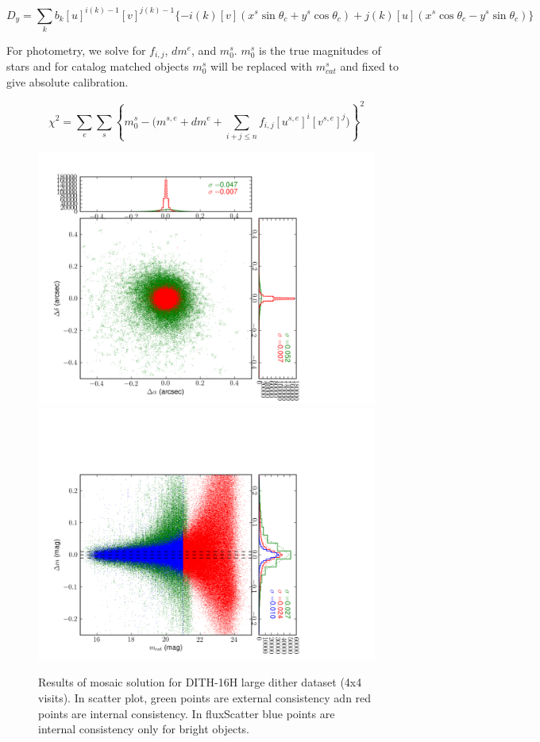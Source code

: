 \documentclass[12pt]{article}
\begin{document}
\begin{equation}
D_y = \sum_k b_k [u]^{i(k)-1} [v]^{j(k)-1} \{-i(k)[v](x^s\sin\theta_c+y^s\cos\theta_c)+j(k)[u](x^s\cos\theta_c-y^s\sin\theta_c) \} 
\end{equation}

For photometry, we solve for $f_{i,j}$, $dm^e$, and $m_0^s$. $m_0^s$ is the true magnitudes of stars and 
for catalog matched objects $m_0^s$ will be replaced with $m_{cat}^s$ and fixed to give absolute
calibration.

\begin{equation}
\chi^2 =  \sum_e \sum_s \left\{ m_0^s - \Biggl( m^{s,e}+dm^e+\sum_{i+j\le n} f_{i,j} [u^{s,e}]^i [v^{s,e}]^j \Biggr) \right\}^2
\end{equation}

\normalsize

\begin{figure}[!htbp]
    \centering
    \includegraphics[scale=0.3]{figures/posScatter150.png}
    \includegraphics[scale=0.3]{figures/fluxScatter150.png}
    \caption{Results of mosaic solution for DITH-16H large dither
      dataset (4x4 visits). In scatter plot, green points are external consistency
      adn red points are internal consistency. In fluxScatter blue points are internal
      consistency only for bright objects.\label{fig:mosaic}}
\end{figure}
\end{document}
